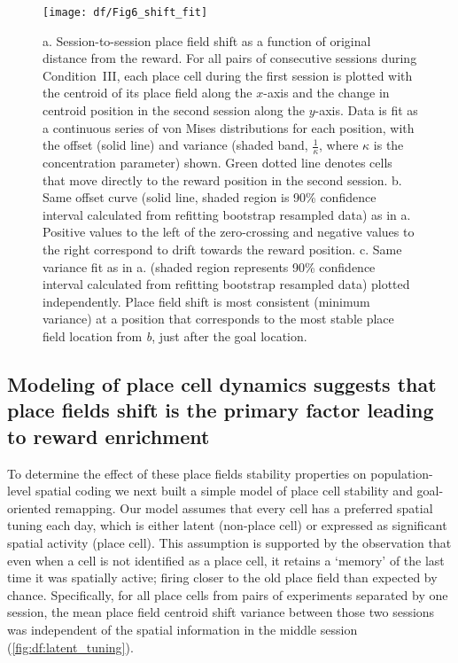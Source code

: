 \begin{figure}
	\centering
	\texttt{[image: df/Fig6\_shift\_fit]}
	\caption[Session-to-session place field shift as a function of original distance from the reward]{a. Session-to-session place field shift as a function of original distance from the reward. For all pairs of consecutive sessions during Condition~III, each place cell during the first session is plotted with the centroid of its place field along the $x$-axis and the change in centroid position in the second session along the $y$-axis. Data is fit as a continuous series of von Mises distributions for each position, with the offset (solid line) and variance (shaded band, $\frac{1}{\kappa}$, where $\kappa$ is the concentration parameter) shown. Green dotted line denotes cells that move directly to the reward position in the second session.
	b. Same offset curve (solid line, shaded region is 90\% confidence interval calculated from refitting bootstrap resampled data) as in a. Positive values to the left of the zero-crossing and negative values to the right correspond to drift towards the reward position.
	c. Same variance fit as in a. (shaded region represents 90\% confidence interval calculated from refitting bootstrap resampled data) plotted independently. Place field shift is most consistent (minimum variance) at a position that corresponds to the most stable place field location from \emph{b}, just after the goal location.}
	\label{fig:df:shift_fit}
\end{figure}

\subsection{Modeling of place cell dynamics suggests that place fields shift is the primary factor leading to reward enrichment}
To determine the effect of these place fields stability properties on population-level spatial coding we next built a simple model of place cell stability and goal-oriented remapping. Our model assumes that every cell has a preferred spatial tuning each day, which is either latent (non-place cell) or expressed as significant spatial activity (place cell). This assumption is supported by the observation that even when a cell is not identified as a place cell, it retains a `memory' of the last time it was spatially active; firing closer to the old place field than expected by chance. Specifically, for all place cells from pairs of experiments separated by one session, the mean place field centroid shift variance between those two sessions was independent of the spatial information in the middle session (\autoref{fig:df:latent_tuning}).


